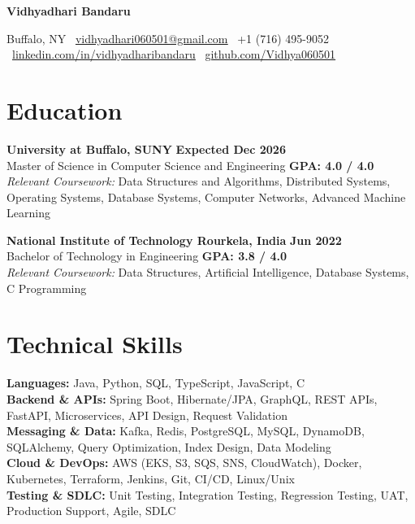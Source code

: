 \documentclass[10pt,letterpaper]{article}
\begin{document}
\raggedbottom
\fontsize{8.7}{9.85}\selectfont
{\centering
{\fontsize{20}{21}\selectfont\bfseries Vidhyadhari Bandaru\par}
\vspace{2pt}
Buffalo, NY \textbar\
\href{mailto:vidhyadhari060501@gmail.com}
{\uline{vidhyadhari060501@gmail.com}} \textbar\
+1 (716) 495-9052 \textbar\
\href{https://www.linkedin.com/in/vidhyadharibandaru}
{\uline{linkedin.com/in/vidhyadharibandaru}} \textbar\
\href{https://github.com/Vidhya060501}
{\uline{github.com/Vidhya060501}}\par
\vspace{1.2pt}
}
\vspace{1pt}

\section*{Education}
\textbf{University at Buffalo, SUNY}
\hfill \textbf{Expected Dec 2026}\\
Master of Science in Computer Science and Engineering
\hfill \textbf{GPA: 4.0 / 4.0}\\
\textit{Relevant Coursework:}
Data Structures and Algorithms, Distributed Systems, Operating Systems,
Database Systems, Computer Networks, Advanced Machine Learning
\vspace{2pt}

\textbf{National Institute of Technology Rourkela, India}
\hfill \textbf{Jun 2022}\\
Bachelor of Technology in Engineering
\hfill \textbf{GPA: 3.8 / 4.0}\\
\textit{Relevant Coursework:}
Data Structures, Artificial Intelligence, Database Systems, C Programming
\vspace{2pt}

\section*{Technical Skills}
{\fontsize{8.5}{8.95}\selectfont
\textbf{Languages:} Java, Python, SQL, TypeScript, JavaScript, C\\
\textbf{Backend \& APIs:} Spring Boot, Hibernate/JPA, GraphQL, REST APIs, FastAPI, Microservices, API Design, Request Validation\\
\textbf{Messaging \& Data:} Kafka, Redis, PostgreSQL, MySQL, DynamoDB, SQLAlchemy, Query Optimization, Index Design, Data Modeling\\
\textbf{Cloud \& DevOps:} AWS (EKS, S3, SQS, SNS, CloudWatch), Docker, Kubernetes, Terraform, Jenkins, Git, CI/CD, Linux/Unix\\
\textbf{Testing \& SDLC:} Unit Testing, Integration Testing, Regression Testing, UAT, Production Support, Agile, SDLC
}
\vspace{2pt}
\end{document}
